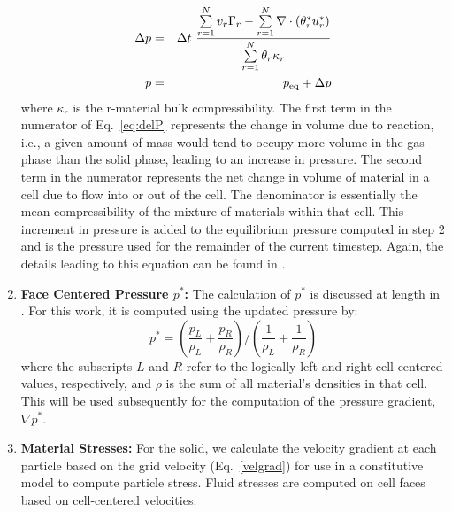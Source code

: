 \begin{enumerate}
\begin{eqnarray}
     \Delta p &=&
     \Delta t~ \frac{ \sum\limits_{r=1}^N v_r\Gamma_r
    -\sum\limits_{r=1}^N \nabla \cdot (\theta^{*}_r {u}^{*}_r)}
     {\sum\limits_{r=1}^N \theta_r\kappa_r}
    \label{eq:delP} \\
    p&=&p_{\text{eq}}+\Delta p \label{eq:time_adv_press}
\end{eqnarray}
where $\kappa_r$ is the r-material bulk compressibility.  The first term in 
the numerator of Eq.~\ref{eq:delP} represents the change in volume due to 
reaction, i.e., a given amount of mass would tend to occupy more volume in 
the gas phase than the solid phase, leading to an increase in pressure.  The 
second term in the numerator represents the net change in volume of material 
in a cell due to flow into or out of the cell.  The denominator is essentially 
the mean compressibility of the mixture of materials within that cell.  
This increment in pressure 
is added to the equilibrium pressure computed in step 2 and is the pressure 
used for the remainder of the current timestep.  Again, the details leading
to this equation can be found in \cite{Kashiwa1994a}.

\item {\bf Face Centered Pressure $p^*$:}
The calculation of $p^*$ is discussed at length in \cite{Kashiwa2000}.
For this work, it is computed using the updated pressure by:
\begin{equation}
p^* = {\left (\frac{p_L}{\rho_L} + \frac{ p_R}{\rho_R}\right)}/
                     {\left (\frac{1}{\rho_L} + \frac{1}{\rho_R}\right)}
\end{equation}
where the subscripts $L$ and $R$ refer to the logically left and right 
cell-centered values, respectively, and $\rho$ is the sum of all material's 
densities in that cell.  This will be used subsequently for the computation 
of the pressure gradient, $\nabla{ p^*}$.

\item {\bf Material Stresses:} For the solid, we calculate the velocity
gradient at each particle based on the grid velocity (Eq.~\ref{velgrad}) for use
in a constitutive model to compute particle stress.  Fluid stresses are
computed on cell faces based on cell-centered velocities.


\end{enumerate}
